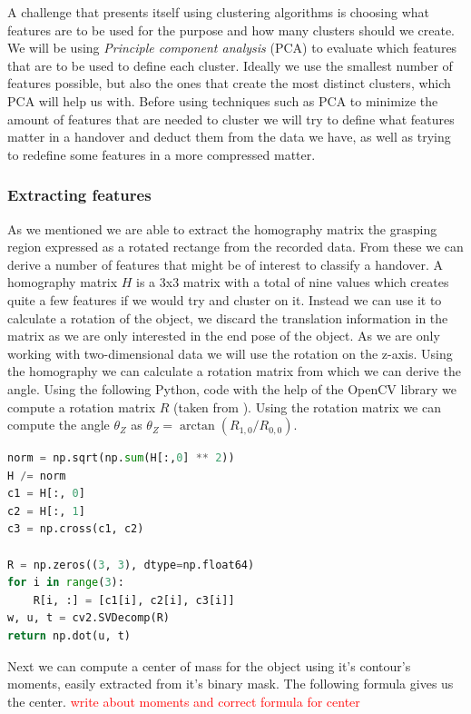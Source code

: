 A challenge that presents itself using clustering algorithms is choosing what features are to be used for the purpose and how many clusters should we create. We will be using \emph{Principle component analysis} (PCA) to evaluate which features that are to be used to define each cluster. Ideally we use the smallest number of features possible, but also the ones that create the most distinct clusters, which PCA will help us with. Before using techniques such as PCA to minimize the amount of features that are needed to cluster we will try to define what features matter in a handover and deduct them from the data we have, as well as trying to redefine some features in a more compressed matter.

\subsubsection{Extracting features}

As we mentioned we are able to extract the homography matrix the grasping region expressed as a rotated rectange from the recorded data. From these we can derive a number of features that might be of interest to classify a handover. A homography matrix \(H\) is a 3x3 matrix with a total of nine values which creates quite a few features if we would try and cluster on it. Instead we can use it to calculate a rotation of the object, we discard the translation information in the matrix as we are only interested in the end pose of the object. As we are only working with two-dimensional data we will use the rotation on the z-axis. Using the homography we can calculate a rotation matrix from which we can derive the angle. Using the following Python, code with the help of the OpenCV library we compute a rotation matrix \(R\) (taken from \parencite{OpenCVHomographyDemo}). Using the rotation matrix we can compute the angle \(\theta_Z\) as \(\theta_Z = \arctan(R_{1,0} / R_{0,0})\).

\begin{lstlisting}[language=Python]
norm = np.sqrt(np.sum(H[:,0] ** 2))
H /= norm
c1 = H[:, 0]
c2 = H[:, 1]
c3 = np.cross(c1, c2)

R = np.zeros((3, 3), dtype=np.float64)
for i in range(3):
	R[i, :] = [c1[i], c2[i], c3[i]]
w, u, t = cv2.SVDecomp(R)
return np.dot(u, t)
\end{lstlisting}

Next we can compute a center of mass for the object using it's contour's moments, easily extracted from it's binary mask. The following formula gives us the center. \textcolor{red}{write about moments and correct formula for center}

